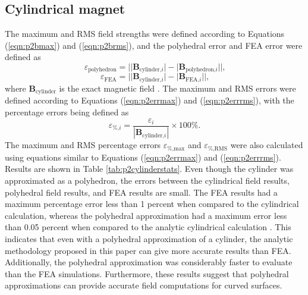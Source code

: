 \subsection*{Cylindrical magnet}
The maximum and RMS field strengths were defined according to Equations (\ref{eqn:p2bmax}) and (\ref{eqn:p2brms}), and the polyhedral error and FEA error were defined as
\begin{equation}
	\varepsilon_{\text{polyhedron}} = \Big|\big|\mathbf{B}_{\text{cylinder,}i}\big| - \big|\mathbf{B}_{\text{polyhedron,}i}\big|\Big| \text{,}
\end{equation}
\begin{equation}
	\varepsilon_{\text{FEA}} = \Big|\big|\mathbf{B}_{\text{cylinder,}i}\big| - \big|\mathbf{B}_{\text{FEA,}i}\big|\Big| \text{,}
\end{equation}
\noindent where \(\mathbf{B}_{\text{cylinder}}\) is the exact magnetic field \cite{Caciagli2018}. The maximum and RMS errors were defined according to Equations (\ref{eqn:p2errmax}) and (\ref{eqn:p2errrms}), with the percentage errors being defined as
\begin{equation}
	\varepsilon_{\text{\%,}i} = \frac{\varepsilon_i}{\left|\mathbf{B}_{\text{cylinder,}i}\right|}\times100\% \text{.}
\end{equation}
\noindent The maximum and RMS percentage errors \(\varepsilon_{\text{\%,max}}\) and \(\varepsilon_{\text{\%,RMS}}\) were also calculated using equations similar to Equations (\ref{eqn:p2errmax}) and (\ref{eqn:p2errrms}). Results are shown in Table \ref{tab:p2cylinderstats}. Even though the cylinder was approximated as a polyhedron, the errors between the cylindrical field results, polyhedral field results, and FEA results are small. The FEA results had a maximum percentage error less than 1 percent when compared to the cylindrical calculation, whereas the polyhedral approximation had a maximum error less than 0.05 percent when compared to the analytic cylindrical calculation \cite{Caciagli2018}. This indicates that even with a polyhedral approximation of a cylinder, the analytic methodology proposed in this paper can give more accurate results than FEA. Additionally, the polyhedral approximation was considerably faster to evaluate than the FEA simulations. Furthermore, these results suggest that polyhedral approximations can provide accurate field computations for curved surfaces.
